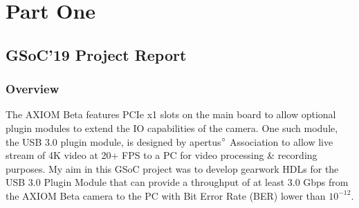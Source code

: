\documentclass[11pt,oneside,fleqn]{book} %
\begin{document}



\pagestyle{empty} %

\tableofcontents %

\cleardoublepage %

\pagestyle{fancy} %


\part{Part One}


\chapter{GSoC'19 Project Report}

\section{Overview}

The AXIOM Beta features PCIe x1 slots on the main board to allow optional plugin modules to extend the IO capabilities of the camera. One such module, the USB 3.0 plugin module, is designed by apertus$\degree$ Association to allow live stream of 4K video at 20+ FPS to a PC for video processing \& recording purposes. My aim in this GSoC project was to develop gearwork HDLs for the USB 3.0 Plugin Module that can provide a throughput of at least 3.0 Gbps from the AXIOM Beta camera to the PC with Bit Error Rate (BER) lower than $10^{-12}$.
\\
\end{document}
